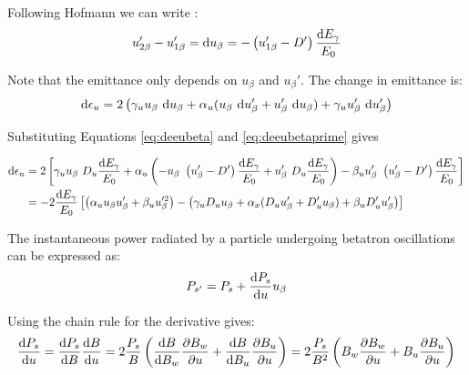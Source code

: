 Following Hofmann we can write \cite{hofmann_2004}:
\begin{equation}
    u_{2\beta}' - u_{1\beta}' = \text{d} u_\beta = - \left( u_{1\beta}' - D' \right) \frac{\text{d} E_\gamma}{E_0}
    \label{eq:deeubetaprime}
\end{equation}

Note that the emittance only depends on $u_\beta$ and $u_\beta'$. The change in emittance is:
\begin{equation}
    \text{d} \epsilon_u = 2 \left( \gamma_u u_\beta\ \text{d} u_\beta + \alpha_u (u_\beta\ \text{d} u_\beta' + u_\beta'\ \text{d} u_\beta) + \gamma_u u_\beta'\ \text{d} u_\beta' \right)
\end{equation}

Substituting Equations \eqref{eq:deeubeta} and \eqref{eq:deeubetaprime} gives

\begin{align}
    \text{d} \epsilon_u &= 2 \left[ \gamma_u u_\beta\ D_u \frac{\text{d} E_\gamma}{E_0} + \alpha_u \left(- u_\beta\ \left( u_\beta' - D' \right) \frac{\text{d} E_\gamma}{E_0} + u_\beta'\ D_u \frac{\text{d} E_\gamma}{E_0} \right) - \beta_u u_\beta'\ \left( u_\beta' - D' \right) \frac{\text{d} E_\gamma}{E_0} \right]\\
                    &= -2 \frac{\text{d} E_\gamma}{E_0} \left[ \left( \alpha_u u_\beta u_\beta' + \beta_u u_\beta'^2 \right)  - \left( \gamma_u D_u u_\beta + \alpha_x (D_u u_\beta' + D_u' u_\beta) + \beta_u D_u' u_\beta' \right)\right]
    \label{eq:changeinemittance}
\end{align}

The instantaneous power radiated by a particle undergoing betatron oscillations can be expressed as:
\begin{equation}
    P_{s'} = P_s + \frac{\text{d} {P_s}}{\text{d} {u}} u_\beta
\end{equation}

Using the chain rule for the derivative gives:
\begin{equation}
    \frac{\text{d} {P_s}}{\text{d} {u}} = \frac{\text{d} {P_s}}{\text{d} {B}} \frac{\text{d} {B}}{\text{d} {u}} = 2\frac{P_s}{B} \left( \frac{\text{d} {B}}{\text{d} {B_w}} \frac{\partial {B_w}}{\partial {u}} + \frac{\text{d} {B}}{\text{d} {B_u}} \frac{\partial {B_u}}{\partial {u}} \right) = 2 \frac{P_s}{B^2} \left( B_w \frac{\partial {B_w}}{\partial {u}} + B_u \frac{\partial {B_u}}{\partial {u}} \right)
\end{equation}

